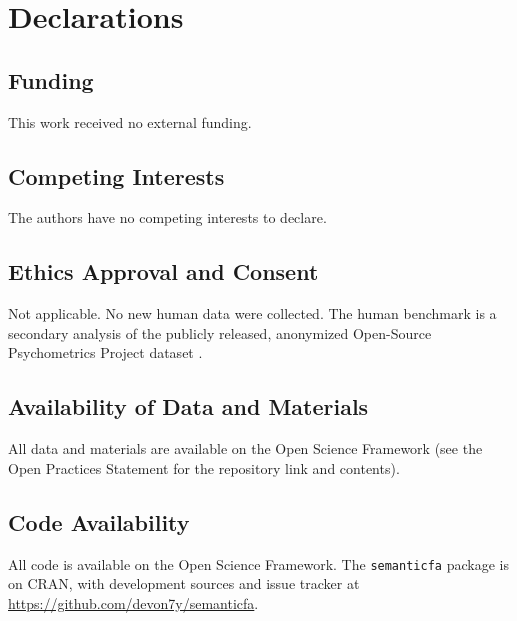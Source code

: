 \newpage
\section{Declarations}

\subsection{Funding}

This work received no external funding.

\subsection{Competing Interests}

The authors have no competing interests to declare.

\subsection{Ethics Approval and Consent}

Not applicable. No new human data were collected. The human benchmark is a
secondary analysis of the publicly released, anonymized Open-Source
Psychometrics Project dataset \citep{openpsychometrics-2018}.

\subsection{Availability of Data and Materials}

All data and materials are available on the Open Science Framework (see the
Open Practices Statement for the repository link and contents).

\subsection{Code Availability}

All code is available on the Open Science Framework. The
\texttt{semanticfa} package is on CRAN, with development sources and issue
tracker at \url{https://github.com/devon7y/semanticfa}.
